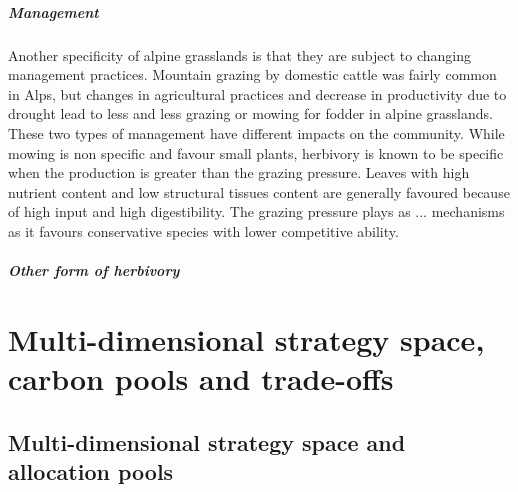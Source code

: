 \paragraph{Management}
Another specificity of alpine grasslands is that they are subject to changing management practices. Mountain grazing by domestic cattle was fairly common in Alps, but changes in agricultural practices and decrease in productivity due to drought lead to less and less grazing or mowing for fodder in alpine grasslands. These two types of management have different impacts on the community. While mowing is non specific and favour small plants, herbivory is known to be specific when the production is greater than the grazing pressure. Leaves with high nutrient content and low structural tissues content are generally favoured because of high input and high digestibility. The grazing pressure plays as ... mechanisms as it favours conservative species with lower competitive ability.

\paragraph{Other form of herbivory}



\chapter{Multi-dimensional strategy space, carbon pools and trade-offs}
\section{Multi-dimensional strategy space and allocation pools}
%

